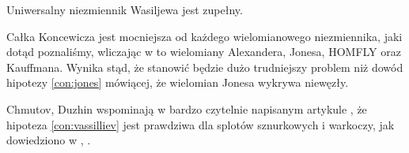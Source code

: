 \begin{conjecture}
    \label{con:vassilliev}
    Uniwersalny niezmiennik Wasiljewa jest zupełny.
\end{conjecture}

Całka Koncewicza jest mocniejsza od każdego wielomianowego niezmiennika, jaki dotąd poznaliśmy, wliczając w to wielomiany Alexandera, Jonesa, HOMFLY oraz Kauffmana.
Wynika stąd, że stanowić będzie dużo trudniejszy problem niż dowód hipotezy \ref{con:jones} mówiącej, że wielomian Jonesa wykrywa niewęzły.

Chmutov, Duzhin wspominają w bardzo czytelnie napisanym artykule \cite{chmutov05}, że hipoteza \ref{con:vassilliev} jest prawdziwa dla splotów sznurkowych i warkoczy, jak dowiedziono w \cite{kohno87}, \cite{barnatandror95}.


